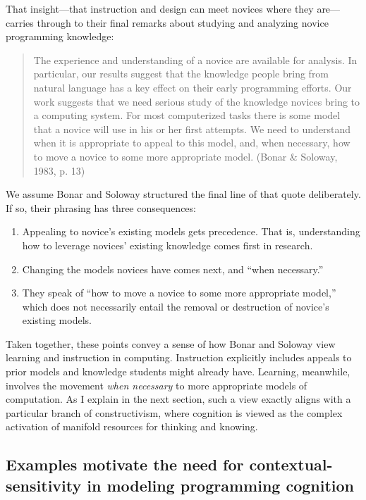 That insight---that instruction and design can meet novices where they
are---carries through to their final remarks about studying and
analyzing novice programming knowledge:

\begin{quote}
  The experience and understanding of a novice are available for analysis.
  In particular, our results suggest that the knowledge people bring from
  natural language has a key effect on their early programming efforts.
  Our work suggests that we need serious study of the knowledge novices
  bring to a computing system. For most computerized tasks there is some
  model that a novice will use in his or her first attempts. We need to
  understand when it is appropriate to appeal to this model, and, when
  necessary, how to move a novice to some more appropriate model. (Bonar
  \& Soloway, 1983, p. 13)
\end{quote}

We assume Bonar and Soloway structured the final line of that quote deliberately. If
so, their phrasing has three consequences:

\begin{enumerate}
\def\labelenumi{\arabic{enumi}.}
\tightlist
\item
  Appealing to novice's existing models gets precedence. That is,
  understanding how to leverage novices' existing knowledge comes first
  in research.
\item
  Changing the models novices have comes next, and ``when necessary.''
\item
  They speak of ``how to move a novice to some more appropriate model,''
  which does not necessarily entail the removal or destruction of
  novice's existing models.
\end{enumerate}

Taken together, these points convey a sense of how Bonar and Soloway
view learning and instruction in computing. Instruction explicitly
includes appeals to prior models and knowledge students might already
have. Learning, meanwhile, involves the movement \emph{when necessary}
to more appropriate models of computation. As I explain in the next
section, such a view exactly aligns with a particular branch of
constructivism, where cognition is viewed as the complex activation of
manifold resources for thinking and knowing.

\subsection{Examples motivate the need for contextual-sensitivity in
modeling programming
cognition}\label{examples-motivate-the-need-for-contextual-sensitivity-in-modeling-programming-cognition}

